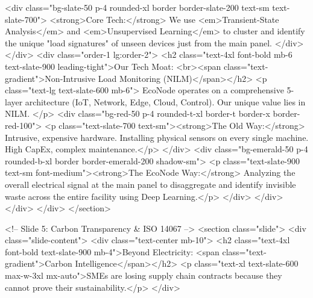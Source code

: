                         <div class="bg-slate-50 p-4 rounded-xl border border-slate-200 text-sm text-slate-700">
                            <strong>Core Tech:</strong> We use <em>Transient-State Analysis</em> and <em>Unsupervised Learning</em> to cluster and identify the unique "load signatures" of unseen devices just from the main panel.
                        </div>
                    </div>
                    <div class="order-1 lg:order-2">
                        <h2 class="text-4xl font-bold mb-6 text-slate-900 leading-tight">Our Tech Moat: <br><span class="text-gradient">Non-Intrusive Load Monitoring (NILM)</span></h2>
                        <p class="text-lg text-slate-600 mb-6">
                            EcoNode operates on a comprehensive 5-layer architecture (IoT, Network, Edge, Cloud, Control). Our unique value lies in NILM.
                        </p>
                        <div class="bg-red-50 p-4 rounded-t-xl border-t border-x border-red-100">
                            <p class="text-slate-700 text-sm"><strong>The Old Way:</strong> Intrusive, expensive hardware. Installing physical sensors on every single machine. High CapEx, complex maintenance.</p>
                        </div>
                        <div class="bg-emerald-50 p-4 rounded-b-xl border border-emerald-200 shadow-sm">
                            <p class="text-slate-900 text-sm font-medium"><strong>The EcoNode Way:</strong> Analyzing the overall electrical signal at the main panel to disaggregate and identify invisible waste across the entire facility using Deep Learning.</p>
                        </div>
                    </div>
                </div>
            </div>
        </section>

        <!-- Slide 5: Carbon Transparency & ISO 14067 -->
        <section class="slide">
            <div class="slide-content">
                <div class="text-center mb-10">
                    <h2 class="text-4xl font-bold text-slate-900 mb-4">Beyond Electricity: <span class="text-gradient">Carbon Intelligence</span></h2>
                    <p class="text-xl text-slate-600 max-w-3xl mx-auto">SMEs are losing supply chain contracts because they cannot prove their sustainability.</p>
                </div>
                
